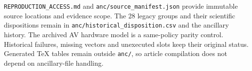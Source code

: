 \texttt{REPRODUCTION\_ACCESS.md} and \texttt{anc/source\_manifest.json} provide immutable source locations and evidence scope. The 28 legacy groups and their scientific dispositions remain in \texttt{anc/historical\_disposition.csv} and the ancillary history. The archived AV hardware model is a same-policy parity control. Historical failures, missing vectors and unexecuted slots keep their original status. Generated TeX tables remain outside \texttt{anc/}, so article compilation does not depend on ancillary-file handling.
